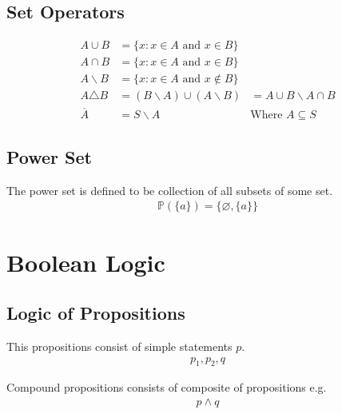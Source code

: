 \documentclass[a4paper]{article}
\theoremstyle{plain}
\theoremstyle{definition}
\newtheorem{defn}{Definition}[section]
\theoremstyle{remark}
\begin{document}
\subsection{Set Operators}
\begin{align*}
	A \cup B &= \{ x : x \in A \text{ and } x \in B \} \\
	A \cap B &= \{ x : x \in A \text{ and } x \in B \}\\
	A \backslash B &= \{ x: x \in A \text{ and } x \notin B \}\\
	A \triangle B &= (B \backslash A ) \cup (A \backslash B) &= A \cup B \backslash A \cap B \\
	\overline{A} &= S \backslash A &\text{Where $A \subseteq S$}
\end{align*}
\subsection{Power Set}
\begin{tcolorbox}[colback=black!3!white,colframe=black!60!white,title=\begin{defn}Power Set \label{Power Set}\end{defn}]
The power set is defined to be collection of all subsets of some set.
\begin{align}
	\mathbb{P}\left( \{a\} \right) = \{\varnothing, \{a\}\}
\end{align}
\end{tcolorbox}
\section{Boolean Logic}
\subsection{Logic of Propositions}
\begin{tcolorbox}[colback=black!3!white,colframe=black!60!white,title=\begin{defn}Atomic Propositions \label{Atomic Propositions}\end{defn}]
This propositions consist of simple statements $p$.
\begin{align}
	p_1,p_2,q
\end{align}

\end{tcolorbox}
\begin{tcolorbox}[colback=black!3!white,colframe=black!60!white,title=\begin{defn}Compound Propositions \label{Compound Propositions}\end{defn}]
Compound propositions consists of composite of propositions e.g.
\begin{align}
	p \land q
\end{align}
\end{tcolorbox}
\end{document}
